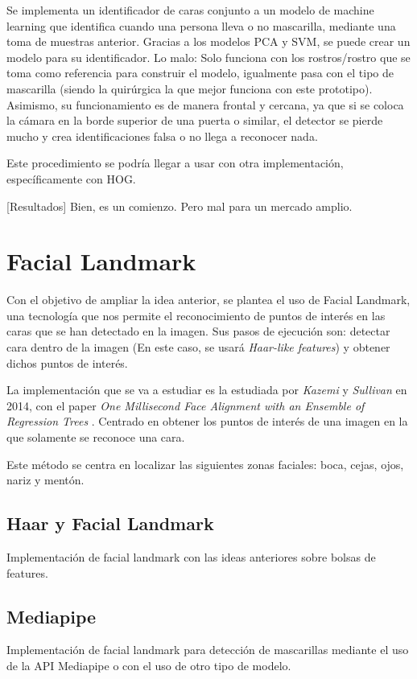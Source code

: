 Se implementa un identificador de caras conjunto a un modelo de machine learning que identifica cuando una persona lleva o no mascarilla, mediante una toma de muestras anterior. Gracias a los modelos PCA y SVM, se puede crear un modelo para su identificador.
Lo malo: Solo funciona con los rostros/rostro que se toma como referencia para construir el modelo, igualmente pasa con el tipo de mascarilla (siendo la quirúrgica la que mejor funciona con este prototipo). Asimismo, su funcionamiento es de manera frontal y cercana, ya que si se coloca la cámara en la borde superior de una puerta o similar, el detector se pierde mucho y crea identificaciones falsa o no llega a reconocer nada.

Este procedimiento se podría llegar a usar con otra implementación, específicamente con HOG. 

[Resultados]
Bien, es un comienzo. Pero mal para un mercado amplio.

\section{Facial Landmark}

Con el objetivo de ampliar la idea anterior, se plantea el uso de Facial Landmark, una tecnología que nos permite el reconocimiento de puntos de interés en las caras que se han detectado en la imagen. Sus pasos de ejecución son: detectar cara dentro de la imagen (En este caso, se usará \textit{Haar-like features}) y obtener dichos puntos de interés.

La implementación que se va a estudiar es la estudiada por \textit{Kazemi} y \textit{Sullivan} en 2014, con el paper \textit{One Millisecond Face Alignment with an Ensemble of Regression Trees} \cite{inproceedings}. Centrado en obtener los puntos de interés de una imagen en la que solamente se reconoce una cara.

Este método se centra en localizar las siguientes zonas faciales: boca, cejas, ojos, nariz y mentón.



\subsection*{Haar y Facial Landmark}
Implementación de facial landmark con las ideas anteriores sobre bolsas de features.

\subsection*{Mediapipe}
Implementación de facial landmark para detección de mascarillas mediante el uso de la API Mediapipe o con el uso de otro tipo de modelo.


